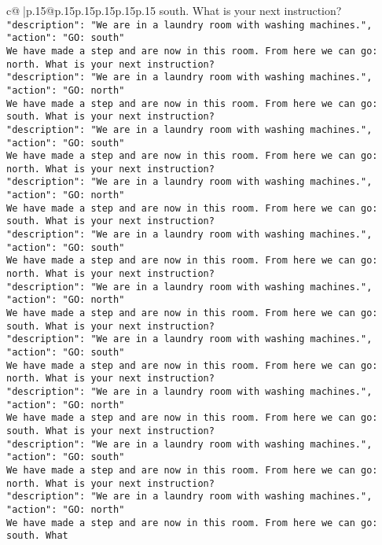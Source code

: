 \documentclass{article}
\begin{document}
{\begin{supertabular}{c@{$\;$}|p{.15\linewidth}@{}p{.15\linewidth}p{.15\linewidth}p{.15\linewidth}p{.15\linewidth}p{.15\linewidth}}
{{{south. What is your next instruction?\\ \tt {"description": "We are in a laundry room with washing machines.", "action": "GO: south"}\\ \tt We have made a step and are now in this room. From here we can go: north. What is your next instruction?\\ \tt {"description": "We are in a laundry room with washing machines.", "action": "GO: north"}\\ \tt We have made a step and are now in this room. From here we can go: south. What is your next instruction?\\ \tt {"description": "We are in a laundry room with washing machines.", "action": "GO: south"}\\ \tt We have made a step and are now in this room. From here we can go: north. What is your next instruction?\\ \tt {"description": "We are in a laundry room with washing machines.", "action": "GO: north"}\\ \tt We have made a step and are now in this room. From here we can go: south. What is your next instruction?\\ \tt {"description": "We are in a laundry room with washing machines.", "action": "GO: south"}\\ \tt We have made a step and are now in this room. From here we can go: north. What is your next instruction?\\ \tt {"description": "We are in a laundry room with washing machines.", "action": "GO: north"}\\ \tt We have made a step and are now in this room. From here we can go: south. What is your next instruction?\\ \tt {"description": "We are in a laundry room with washing machines.", "action": "GO: south"}\\ \tt We have made a step and are now in this room. From here we can go: north. What is your next instruction?\\ \tt {"description": "We are in a laundry room with washing machines.", "action": "GO: north"}\\ \tt We have made a step and are now in this room. From here we can go: south. What is your next instruction?\\ \tt {"description": "We are in a laundry room with washing machines.", "action": "GO: south"}\\ \tt We have made a step and are now in this room. From here we can go: north. What is your next instruction?\\ \tt {"description": "We are in a laundry room with washing machines.", "action": "GO: north"}\\ \tt We have made a step and are now in this room. From here we can go: south. What 
	  } 
	   } 
	   } 
	  \\ 
 


\end{supertabular}}
\end{document}
